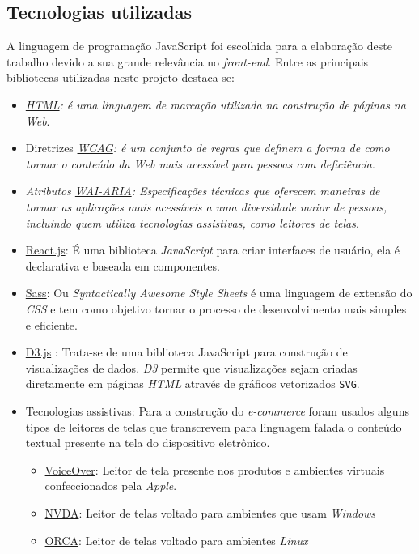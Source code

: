 \subsection{Tecnologias utilizadas} 
{A linguagem de programação JavaScript foi escolhida para a elaboração deste trabalho devido a sua grande relevância no \textit{front-end}. Entre as principais bibliotecas utilizadas neste projeto destaca-se:
\begin{itemize}
\item \textit{\href{https://developer.mozilla.org/pt-BR/docs/Web/HTML}{HTML}: é uma linguagem de marcação utilizada na construção de páginas na \textit{Web}}.
\item Diretrizes \textit{\href{https://www.w3c.br/traducoes/wcag/wcag21-pt-BR/}{WCAG}: é um conjunto de regras que definem a forma de como tornar o conteúdo da \textit{Web} mais acessível para pessoas com deficiência}.
\item \textit{Atributos \href{https://www.w3.org/TR/wai-aria-1.2/}{WAI-ARIA}: Especificações técnicas que oferecem maneiras de tornar as aplicações mais acessíveis a uma diversidade maior de pessoas, incluindo quem utiliza tecnologias assistivas, como leitores de telas}.
\item { \href{https://pt-br.reactjs.org/}{React.js}: É uma biblioteca \textit{JavaScript} para criar interfaces de usuário, ela é declarativa e baseada em componentes}.
\item {\href{https://sass-lang.com/}{Sass}: Ou \textit{Syntactically Awesome Style Sheets} é uma linguagem de extensão do \textit{CSS} e tem como objetivo tornar o processo de desenvolvimento mais simples e eficiente}.
\item {\href{https://d3js.org/}{D3.js} : Trata-se de uma biblioteca {JavaScript} para construção de visualizações de dados. \textit{D3} permite que visualizações sejam criadas diretamente em páginas \textit{HTML} através de gráficos vetorizados \lstinline{SVG}}.
\item Tecnologias assistivas: Para a construção do \textit{e-commerce} foram usados alguns tipos de leitores de telas que transcrevem para linguagem falada o conteúdo textual presente na tela do dispositivo eletrônico. 
\begin{itemize}
\item \href{https://www.apple.com/br/accessibility/vision/}{VoiceOver}: Leitor de tela presente nos produtos e ambientes virtuais confeccionados pela \textit{Apple}. 
\item \href{https://www.nvaccess.org/download/}{NVDA}: Leitor de telas voltado para ambientes que usam \textit{Windows}
\item \href{https://help.gnome.org/users/orca/stable/index.html.pt_BR}{ORCA}: Leitor de telas voltado para ambientes \textit{Linux}
\end{itemize}
\end{itemize}
 }
 
